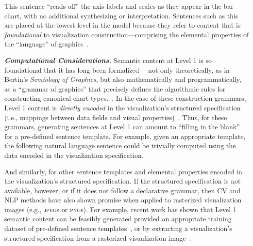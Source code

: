 \noindent
This sentence ``reads off'' the axis labels and scales as they appear in the bar chart, with no additional synthesizing or interpretation.
Sentences such as this are placed at the lowest level in the model because they refer to content that is \emph{foundational} to visualization construction---comprising the elemental properties of the ``language'' of graphics~\cite{bertin_semiology_1983}.

\textbf{\emph{Computational Considerations.}}
Semantic content at Level 1 is so foundational that it has long been formalized\,---\,not only theoretically, as in Bertin's \emph{Semiology of Graphics}, but also mathematically and programmatically, as a ``grammar of graphics'' that precisely defines the algorithmic rules for constructing canonical chart types.~\cite{wilkinson_grammar_2005}.
In the case of these construction grammars, Level 1 content is \emph{directly encoded} in the visualization's structured specification (i.e., mappings between data fields and visual properties)~\cite{satyanarayan_vega-lite_2017}.
Thus, for these grammars, generating sentences at Level 1 can amount to ``filling in the blank'' for a pre-defined sentence template. For example, given an appropriate template, the following natural language sentence could be trivially computed using the data encoded in the visualization specification.
\begin{displayquote}
    \vspace{-1mm}
    \vspace{-1mm}
\end{displayquote}
\noindent
And similarly, for other sentence templates and elemental properties encoded in the visualization's structured specification.
If the structured specification is not available, however, or if it does not follow a declarative grammar, then \ac{CV} and \ac{NLP} methods have also shown promise when applied to rasterized visualization images (e.g., \textsc{jpeg}s or \textsc{png}s).
For example, recent work has shown that Level 1 semantic content can be feasibly generated provided an appropriate training dataset of pre-defined sentence templates~\cite{kahou_figureqa_2018}, or by extracting a visualization's structured specification from a rasterized visualization image~\cite{poco_reverse-engineering_2017}.

